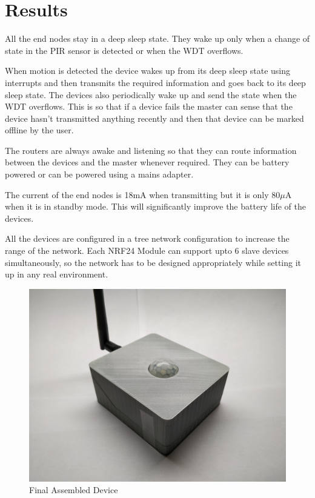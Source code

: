 \documentclass[journal]{IEEEtran}
\begin{document}
\section{Results}
All the end nodes stay in a deep sleep state. They wake up only when a change of state in the PIR sensor is detected or when the WDT overflows. 

When motion is detected the device wakes up from its deep sleep state using interrupts and then transmits the required information and goes back to its deep sleep state. 
The devices also periodically wake up and send the state when the WDT overflows. This is so that if a device fails the master can sense that the device hasn't transmitted anything recently and then that device can be marked offline by the user.

The routers are always awake and listening so that they can route information between the devices and the master whenever required. They can be battery powered or can be powered using a mains adapter.

The current of the end nodes is 18mA when transmitting but it is only 80$\mu$A when it is in standby mode. This will significantly improve the battery life of the devices.

All the devices are configured in a tree network configuration to increase the range of the network. Each NRF24 Module can support upto 6 slave devices simultaneously, so the network has to be designed appropriately while setting it up in any real environment.

\begin{figure}[ht]
\centering
\includegraphics[scale=.05]{FinalProduct.jpg}
\caption{Final Assembled Device}
\label{fig_final}
\end{figure}
\end{document}
